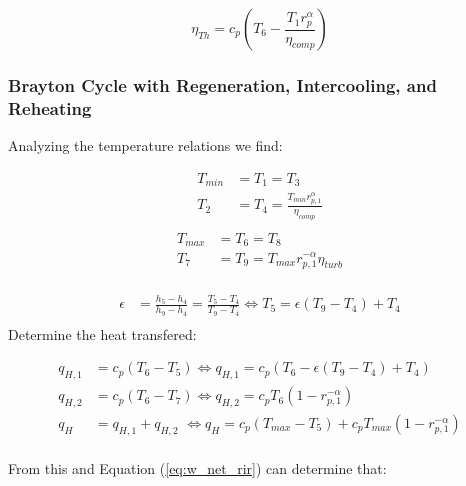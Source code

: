 \documentclass[
	12pt, %
]{brayton_cycle_report_style}
\begin{document}
\vspace{-10mm}

\begin{equation}
    \eta_{Th}=c_p(T_{6}-\frac{T_1r_p^\alpha}{\eta_{comp}})
\end{equation}

\subsubsection{Brayton Cycle with Regeneration, Intercooling, and Reheating} 

Analyzing the temperature relations we find:

\vspace{-5mm}

\begin{multicols}{2}
  \begin{align*}
    T_{min} &= T_1 = T_3 \\
    T_2 &= T_4 = \frac{T_{min}r_{p,1}^\alpha}{\eta_{comp}} \\
  \end{align*}
  \begin{align*}
    T_{max} &= T_6 = T_8 \\
     T_7 &= T_9= T_{max}r_{p,1}^{-\alpha}\eta_{turb} \\
  \end{align*}
\end{multicols}
\vspace{-7.5mm}
\begin{align*}
    \epsilon &= \frac{h_5-h_4}{h_9-h_4}=\frac{T_5-T_4}{T_9-T_4} \iff T_5 = \epsilon(T_9-T_4)+T_4\\ 
\end{align*}
\noindent Determine the heat transfered:

\vspace{5mm}


\begin{align*}
    q_{H,1} & =c_p(T_{6}-T_5) \iff q_{H,1} =c_p(T_{6}-\epsilon(T_9-T_4)+T_4)\\
    q_{H,2} &=c_p(T_{6}-T_7) \iff q_{H,2} = c_pT_{6}(1-r_{p,1}^{-\alpha})\\
    q_H &= q_{H,1}+q_{H,2} \,\, \iff  q_H = c_p(T_{max}-T_5)+c_pT_{max}(1-r_{p,1}^{-\alpha})\\
\end{align*}



\noindent From this and Equation (\ref{eq:w_net_rir}) can determine that:
\end{document}
